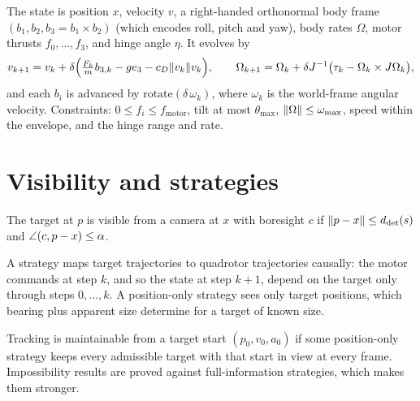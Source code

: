 \begin{definition}
\label{def:quad-traj}
\leanok
{}
The state is position $x$, velocity $v$, a right-handed orthonormal body frame
$(b_1,b_2,b_3=b_1\times b_2)$ (which encodes roll, pitch and yaw), body rates
$\Omega$, motor thrusts $f_0,\dots,f_3$, and hinge angle $\eta$. It evolves by
\[
  v_{k+1}=v_k+\delta\Bigl(\tfrac{F_k}{m}b_{3,k}-ge_3-c_D\lVert v_k \rVert v_k\Bigr),\qquad
  \Omega_{k+1}=\Omega_k+\delta J^{-1}\bigl(\tau_k-\Omega_k\times J\Omega_k\bigr),
\]
and each $b_i$ is advanced by $\mathrm{rotate}(\delta\,\omega_k)$, where $\omega_k$
is the world-frame angular velocity. Constraints: $0\le f_i\le f_{\mathrm{motor}}$,
tilt at most $\theta_{\max}$, $\lVert \Omega \rVert\le\omega_{\max}$, speed within the
envelope, and the hinge range and rate.
\end{definition}

\section{Visibility and strategies}

\begin{definition}[Visibility]
\label{def:visible}
\leanok
{}
The target at $p$ is visible from a camera at $x$ with boresight $c$ if
$\lVert p-x \rVert\le d_{\mathrm{det}}(s)$ and $\angle(c,p-x)\le\alpha$.
\end{definition}

\begin{definition}[Strategies]
\label{def:strategy}
\leanok
{}
A strategy maps target trajectories to quadrotor trajectories causally: the motor
commands at step $k$, and so the state at step $k+1$, depend on the target only
through steps $0,\dots,k$. A position-only strategy sees only target positions,
which bearing plus apparent size determine for a target of known size.
\end{definition}

\begin{definition}[Maintainable]
\label{def:maintainable}
\leanok
{}
Tracking is maintainable from a target start $(p_0,v_0,a_0)$ if some position-only
strategy keeps every admissible target with that start in view at every frame.
Impossibility results are proved against full-information strategies, which makes
them stronger.
\end{definition}
